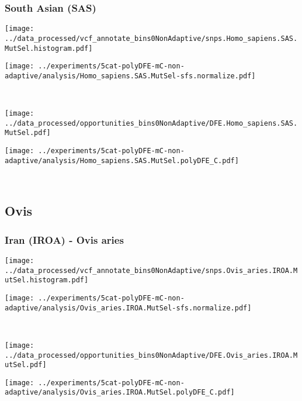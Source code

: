 \subsubsection{South Asian (SAS)}

\begin{minipage}{0.49\linewidth}
    \texttt{[image: ../data\_processed/vcf\_annotate\_bins0NonAdaptive/snps.Homo\_sapiens.SAS.MutSel.histogram.pdf]}
\end{minipage}
\begin{minipage}{0.49\linewidth}
    \texttt{[image: ../experiments/5cat-polyDFE-mC-non-adaptive/analysis/Homo\_sapiens.SAS.MutSel-sfs.normalize.pdf]}
\end{minipage}
\\
\begin{minipage}{0.49\linewidth}
    \texttt{[image: ../data\_processed/opportunities\_bins0NonAdaptive/DFE.Homo\_sapiens.SAS.MutSel.pdf]}
\end{minipage}
\begin{minipage}{0.49\linewidth}
    \texttt{[image: ../experiments/5cat-polyDFE-mC-non-adaptive/analysis/Homo\_sapiens.SAS.MutSel.polyDFE\_C.pdf]}
\end{minipage}
\\

\subsection{Ovis}

\subsubsection{Iran (IROA) - Ovis aries}

\begin{minipage}{0.49\linewidth}
    \texttt{[image: ../data\_processed/vcf\_annotate\_bins0NonAdaptive/snps.Ovis\_aries.IROA.MutSel.histogram.pdf]}
\end{minipage}
\begin{minipage}{0.49\linewidth}
    \texttt{[image: ../experiments/5cat-polyDFE-mC-non-adaptive/analysis/Ovis\_aries.IROA.MutSel-sfs.normalize.pdf]}
\end{minipage}
\\
\begin{minipage}{0.49\linewidth}
    \texttt{[image: ../data\_processed/opportunities\_bins0NonAdaptive/DFE.Ovis\_aries.IROA.MutSel.pdf]}
\end{minipage}
\begin{minipage}{0.49\linewidth}
    \texttt{[image: ../experiments/5cat-polyDFE-mC-non-adaptive/analysis/Ovis\_aries.IROA.MutSel.polyDFE\_C.pdf]}
\end{minipage}
\\

